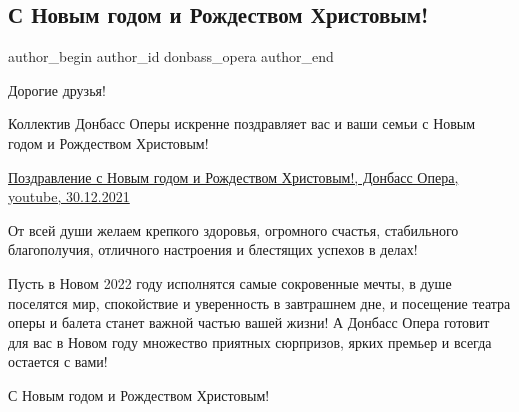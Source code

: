  
 
 
 
 
\subsection{С Новым годом и Рождеством Христовым!}
\label{sec:30_12_2021.vk.donbass_opera.1.s_novym_godom_i_rozhdestvom}

\ifcmt
 author_begin
   author_id donbass_opera
 author_end
\fi

Дорогие друзья!

Коллектив Донбасс Оперы искренне поздравляет вас и ваши семьи с Новым годом и
Рождеством Христовым!

\href{https://www.youtube.com/watch?v=_6e5t0kygGc}{%
Поздравление с Новым годом и Рождеством Христовым!, Донбасс Опера, youtube, 30.12.2021%
}


От всей души желаем крепкого здоровья, огромного счастья, стабильного
благополучия, отличного настроения и блестящих успехов в делах!


Пусть в Новом 2022 году исполнятся самые сокровенные мечты, в душе поселятся
мир, спокойствие и уверенность в завтрашнем дне, и посещение театра оперы и
балета станет важной частью вашей жизни! А Донбасс Опера готовит для вас в
Новом году множество приятных сюрпризов, ярких премьер и всегда остается с
вами!

С Новым годом и Рождеством Христовым!
